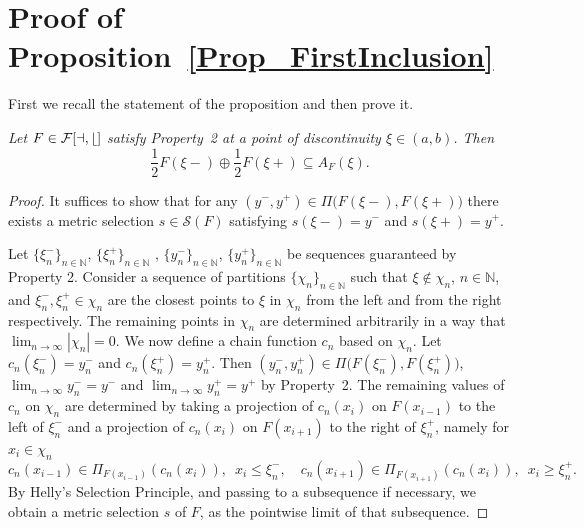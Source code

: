 \documentclass[final,3p,mathptmx]{article}%
\newcommand{\N}{{\mathbb N}}
\newcommand{\PrjXonY}[2]{\Pi_{#2}{(#1)} }
\newcommand{\Pair}[2]{\Pi \big ( {#1},{#2} \big )}
\newcommand{\calF}{\cal{F}[a,b]}
\newcommand{\setMS}{\mathcal{S}(F)}
\newtheorem{propos}[remark]{Proposition}
\begin{document}
{{{%

\section{Proof of Proposition~\ref{Prop_FirstInclusion}}
First we recall the statement of the proposition and then prove it.
\medskip

\textit{Let $F \in \calF$ satisfy Property~2 at a point of discontinuity $\xi \in (a,b)$. Then 
	$$ 
	\frac{1}{2} F(\xi-)\oplus \frac{1}{2} F(\xi+) \subseteq A_F(\xi).
	$$
}
\begin{proof}
	It suffices to show that for any $(y^-, y^+) \in \Pair{F(\xi-)}{F(\xi+)}$ there exists a metric selection $s \in \setMS$ satisfying
	$s(\xi-) = y^-$ and $s(\xi+) = y^+$.
	
	Let $\{\xi_n^-\}_{n \in \N} $, $\{\xi_n^+\}_{n \in \N}$ ,
	$\{y_n^-\}_{n \in \N} $, $\{y_n^+\}_{n \in \N}$ be sequences guaranteed by Property 2.
	Consider a sequence of partitions  $\{ \chi_n \}_{n\in \N}$ such that $\xi \notin \chi_n$, $n \in \N$, 
	and $\xi_n^- , \xi_n^+  \in \chi_n$ are the closest points to $\xi$ in $\chi_n$ from the left and from the right respectively. The remaining points in $\chi_n$ are determined arbitrarily in a way that $\displaystyle \lim_{n \to \infty } | \chi_n | =0$. We now define a chain function $c_n$ based on $\chi_n$. Let 
	$c_n(\xi_n^-)=y_n^-$ and  $c_n(\xi_n^+)=y_n^+$. Then $(y_n^-, y_n^+) \in \Pair{F(\xi_n^-)}{F(\xi_n^+)}$, $\displaystyle \lim_{n \to \infty } y_n^- = y^-$  and 
	$\displaystyle \lim_{n \to \infty } y_n^+ = y^+$ by Property~2. %
	The remaining values of $c_n$ on $\chi_n$ are determined by taking a projection of $c_n(x_i)$ on $F(x_{i-1})$ to the left of $\xi_n^{-}$ and a projection of $c_n(x_i)$ on $F(x_{i+1})$ to the right of $\xi_n^{+}$, namely for $x_i \in \chi_n$
	$$
	c_n(x_{i-1}) \in \PrjXonY{c_n(x_i)}{F(x_{i-1})}, \; \ x_i \le \xi_n^- , \quad 
	c_n(x_{i+1}) \in \PrjXonY{c_n(x_i)}{F(x_{i+1})}, \; \ x_i \ge \xi_n^+.
	$$
	By Helly's Selection Principle, and passing to a subsequence if necessary, we obtain a metric selection $s$ of $F$, as the pointwise  limit of that subsequence.
	

\end{proof}}}}
\end{document}
